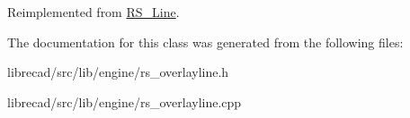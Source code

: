 Reimplemented from \hyperlink{classRS__Line_abbf35036555e09aa10ac2606aafab1b6}{R\-S\-\_\-\-Line}.



The documentation for this class was generated from the following files\-:\begin{DoxyCompactItemize}
\item 
librecad/src/lib/engine/rs\-\_\-overlayline.\-h\item 
librecad/src/lib/engine/rs\-\_\-overlayline.\-cpp\end{DoxyCompactItemize}
